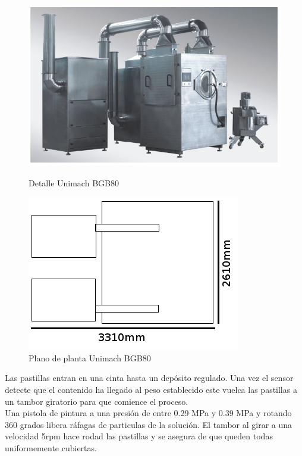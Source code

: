 	\begin{figure}[htp]
		\begin{minipage}{.48\textwidth}
			\centering
			\includegraphics[scale=0.3]{Datasheets/4Foto.png}
			\caption{Detalle Unimach BGB80}
			\label{fig:testa}
		\end{minipage}
		\begin{minipage}{.48\textwidth}
			\centering
			\includegraphics[scale=0.6]{Datasheets/Miniaturas/revestimiento.png}
			\caption{Plano de planta Unimach BGB80}
			\label{fig:testb}
		\end{minipage}
	\end{figure}

	
	

	Las pastillas entran en una cinta hasta un depósito regulado. Una vez el sensor detecte que el contenido ha llegado al peso establecido este vuelca las pastillas a un tambor giratorio para que comience el proceso.\\

	Una pistola de pintura a una presión de entre 0.29 MPa y 0.39 MPa y rotando 360 grados libera ráfagas de particulas de la solución. El tambor al girar a una velocidad 5rpm hace rodad las pastillas y se asegura de que queden todas uniformemente cubiertas.\\

